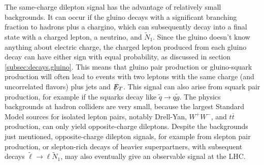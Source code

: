 \documentclass[12pt]{article}
\def\stilde{\widetilde}
\def\NI{\stilde N_1}
\def\Et{{\slashchar{E}_T}}
\def\slashchar#1{\setbox0=\hbox{$#1$}           %
   \dimen0=\wd0                                 %
   \setbox1=\hbox{/} \dimen1=\wd1               %
   \ifdim\dimen0>\dimen1                        %
      \rlap{\hbox to \dimen0{\hfil/\hfil}}      %
      #1                                        %
   \else                                        %
      \rlap{\hbox to \dimen1{\hfil$#1$\hfil}}   %
      /                                         %
   \fi}                                        %
\begin{document}
The same-charge dilepton signal \cite{likesigndilepton} has the advantage 
of relatively small
backgrounds. It can occur if the gluino decays with a 
significant branching fraction to hadrons 
plus a chargino, which can subsequently decay into a final state with a charged lepton, a 
neutrino, and $\stilde N_1$. Since the gluino doesn't know anything about 
electric charge, the 
charged lepton produced from each gluino decay can have either sign with equal 
probability, as discussed in section 
\ref{subsec:decays.gluino}. This means that gluino pair 
production or gluino-squark production will often lead 
to events with two leptons with the same 
charge (and uncorrelated flavors) plus jets and $\Et$. 
This signal can also arise from  squark 
pair production, for example if the squarks decay like 
$\stilde q \rightarrow q\stilde g$. The physics backgrounds at hadron 
colliders are very small, 
because the largest Standard Model sources for isolated lepton pairs, notably Drell-Yan,
$W^+W^-$, and $t\overline t$ production, can only yield opposite-charge dileptons. 
Despite the backgrounds just mentioned, 
opposite-charge dilepton signals, for example from 
slepton pair production, or slepton-rich decays 
of heavier superpartners, with subsequent decays 
$\stilde \ell \rightarrow \ell \NI$, may also eventually 
give an observable signal at the LHC.
\end{document}
